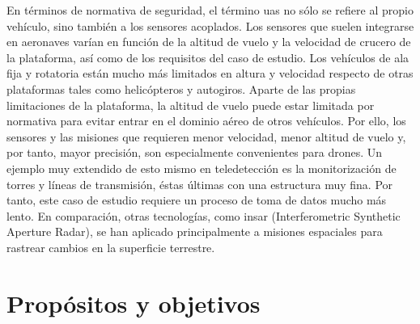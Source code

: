 En términos de normativa de seguridad, el término \acrshort{uas} no sólo se refiere al propio vehículo, sino también a los sensores acoplados. Los sensores que suelen integrarse en aeronaves varían en función de la altitud de vuelo y la velocidad de crucero de la plataforma, así como de los requisitos del caso de estudio. Los vehículos de ala fija y rotatoria están mucho más limitados en altura y velocidad respecto de otras plataformas tales como helicópteros y autogiros. Aparte de las propias limitaciones de la plataforma, la altitud de vuelo puede estar limitada por normativa para evitar entrar en el dominio aéreo de otros vehículos. Por ello, los sensores y las misiones que requieren menor velocidad, menor altitud de vuelo y, por tanto, mayor precisión, son especialmente convenientes para drones. Un ejemplo muy extendido de esto mismo en teledetección es la monitorización de torres y líneas de transmisión, éstas últimas con una estructura muy fina. Por tanto, este caso de estudio requiere un proceso de toma de datos mucho más lento. En comparación, otras tecnologías, como \acrshort{insar} (Interferometric Synthetic Aperture Radar), se han aplicado principalmente a misiones espaciales para rastrear cambios en la superficie terrestre.

\section{Propósitos y objetivos}

